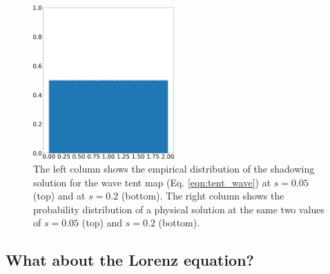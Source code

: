 \begin{figure}[H]
    \includegraphics[width=0.48\textwidth]{figure/tent_wave_physical_density_0.2.png}
    \caption{The left column shows the empirical distribution of the shadowing solution for the wave tent map (Eq. \ref{eqn:tent_wave}) at $s=0.05$ (top) and at $s=0.2$ (bottom). The right column shows the probability distribution of a physical solution at the same two values of $s = 0.05$ (top) and $s = 0.2$ (bottom).}
    \label{fig:tent_wave_shadow}
\end{figure}

\subsection{What about the Lorenz equation?}

